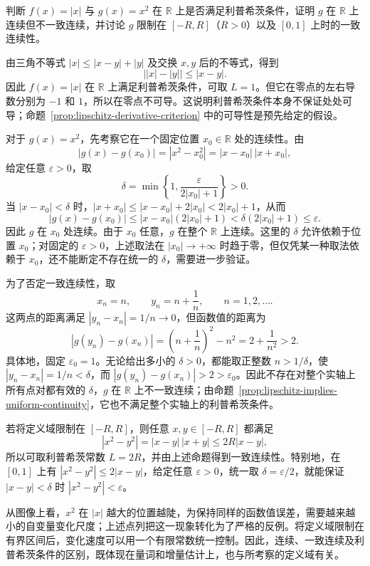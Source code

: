 \begin{example}
\label{ex:lipschitz-absolute-value-and-square}
判断 $f(x)=|x|$ 与 $g(x)=x^2$ 在 $\mathbb{R}$ 上是否满足利普希茨条件，证明 $g$ 在 $\mathbb{R}$ 上连续但不一致连续，并讨论 $g$ 限制在 $[-R,R]$（$R>0$）以及 $[0,1]$ 上时的一致连续性。
\end{example}

\begin{solve}
由三角不等式 $|x|\leq|x-y|+|y|$ 及交换 $x,y$ 后的不等式，得到
\[
    \bigl||x|-|y|\bigr|\leq|x-y|.
\]
因此 $f(x)=|x|$ 在 $\mathbb{R}$ 上满足利普希茨条件，可取 $L=1$。但它在零点的左右导数分别为 $-1$ 和 $1$，所以在零点不可导。这说明利普希茨条件本身不保证处处可导；命题~\ref{prop:lipschitz-derivative-criterion} 中的可导性是预先给定的假设。

对于 $g(x)=x^2$，先考察它在一个固定位置 $x_0\in\mathbb{R}$ 处的连续性。由
\[
    |g(x)-g(x_0)|=|x^2-x_0^2|=|x-x_0|\,|x+x_0|,
\]
给定任意 $\varepsilon>0$，取
\[
    \delta=\min\left\{1,\frac{\varepsilon}{2|x_0|+1}\right\}>0.
\]
当 $|x-x_0|<\delta$ 时，$|x+x_0|\leq|x-x_0|+2|x_0|<2|x_0|+1$，从而
\[
    |g(x)-g(x_0)|\leq|x-x_0|(2|x_0|+1)
    <\delta(2|x_0|+1)\leq\varepsilon.
\]
因此 $g$ 在 $x_0$ 处连续。由于 $x_0$ 任意，$g$ 在整个 $\mathbb{R}$ 上连续。这里的 $\delta$ 允许依赖于位置 $x_0$；对固定的 $\varepsilon>0$，上述取法在 $|x_0|\to+\infty$ 时趋于零，但仅凭某一种取法依赖于 $x_0$，还不能断定不存在统一的 $\delta$，需要进一步验证。

为了否定一致连续性，取
\[
    x_n=n,\qquad y_n=n+\frac1n,\qquad n=1,2,\ldots.
\]
这两点的距离满足 $|y_n-x_n|=1/n\to0$，但函数值的距离为
\[
    |g(y_n)-g(x_n)|=\left(n+\frac1n\right)^2-n^2
    =2+\frac1{n^2}>2.
\]
具体地，固定 $\varepsilon_0=1$。无论给出多小的 $\delta>0$，都能取正整数 $n>1/\delta$，使 $|y_n-x_n|=1/n<\delta$，而 $|g(y_n)-g(x_n)|>2>\varepsilon_0$。因此不存在对整个实轴上所有点对都有效的 $\delta$，$g$ 在 $\mathbb{R}$ 上不一致连续；由命题~\ref{prop:lipschitz-implies-uniform-continuity}，它也不满足整个实轴上的利普希茨条件。

若将定义域限制在 $[-R,R]$，则任意 $x,y\in[-R,R]$ 都满足
\[
    |x^2-y^2|=|x-y|\,|x+y|\leq2R|x-y|,
\]
所以可取利普希茨常数 $L=2R$，并由上述命题得到一致连续性。特别地，在 $[0,1]$ 上有 $|x^2-y^2|\leq2|x-y|$，给定任意 $\varepsilon>0$，统一取 $\delta=\varepsilon/2$，就能保证 $|x-y|<\delta$ 时 $|x^2-y^2|<\varepsilon$。

从图像上看，$x^2$ 在 $|x|$ 越大的位置越陡，为保持同样的函数值误差，需要越来越小的自变量变化尺度；上述点列把这一现象转化为了严格的反例。将定义域限制在有界区间后，变化速度可以用一个有限常数统一控制。因此，连续、一致连续及利普希茨条件的区别，既体现在量词和增量估计上，也与所考察的定义域有关。
\end{solve}

